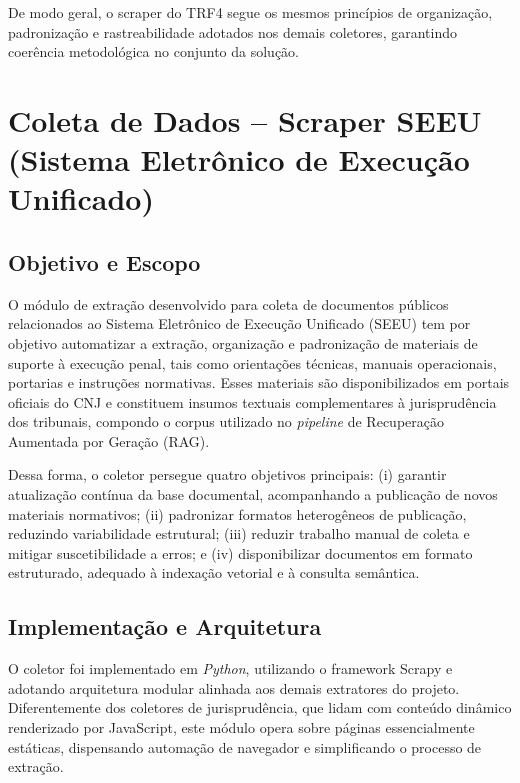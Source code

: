 De modo geral, o scraper do TRF4 segue os mesmos princípios de organização, padronização e rastreabilidade adotados nos demais coletores, garantindo coerência metodológica no conjunto da solução.

% 

\section{Coleta de Dados -- Scraper SEEU (Sistema Eletrônico de Execução Unificado)}
\label{sec:seeu_scraper}

\subsection{Objetivo e Escopo}
O módulo de extração desenvolvido para coleta de documentos públicos relacionados ao Sistema Eletrônico de Execução Unificado (SEEU) tem por objetivo automatizar a extração, organização e padronização de materiais de suporte à execução penal, tais como orientações técnicas, manuais operacionais, portarias e instruções normativas. Esses materiais são disponibilizados em portais oficiais do CNJ e constituem insumos textuais complementares à jurisprudência dos tribunais, compondo o corpus utilizado no \textit{pipeline} de Recuperação Aumentada por Geração (RAG).

Dessa forma, o coletor persegue quatro objetivos principais: (i) garantir atualização contínua da base documental, acompanhando a publicação de novos materiais normativos; (ii) padronizar formatos heterogêneos de publicação, reduzindo variabilidade estrutural; (iii) reduzir trabalho manual de coleta e mitigar suscetibilidade a erros; e (iv) disponibilizar documentos em formato estruturado, adequado à indexação vetorial e à consulta semântica.

\subsection{Implementação e Arquitetura}
O coletor foi implementado em \textit{Python}, utilizando o framework Scrapy e adotando arquitetura modular alinhada aos demais extratores do projeto. Diferentemente dos coletores de jurisprudência, que lidam com conteúdo dinâmico renderizado por JavaScript, este módulo opera sobre páginas essencialmente estáticas, dispensando automação de navegador e simplificando o processo de extração.

